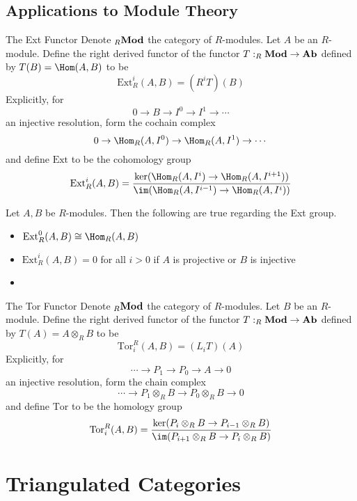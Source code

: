 \documentclass[a4paper]{article}
\begin{document}
\subsection{Applications to Module Theory}
\begin{defn}{The Ext Functor}{} Denote $_R\bold{Mod}$ the category of $R$-modules. Let $A$ be an $R$-module. Define the right derived functor of the functor $T:_R\bold{Mod}\to\bold{Ab}$ defined by $T(B)=\Hom(A,B)$ to be $$\text{Ext}_R^i(A,B)=(R^iT)(B)$$ Explicitly, for $$0\to B\to I^0\to I^1\to\cdots$$ an injective resolution, form the cochain complex $$0\to\Hom_R(A,I^0)\to\Hom_R(A,I^1)\to\cdots$$ and define $\text{Ext}$ to be the cohomology group $$\text{Ext}_R^i(A,B)=\frac{\ker(\Hom_R(A,I^i)\to\Hom_R(A,I^{i+1}))}{\im(\Hom_R(A,I^{i-1})\to\Hom_R(A,I^i))}$$
\end{defn}

\begin{thm}{}{} Let $A,B$ be $R$-modules. Then the following are true regarding the Ext group. 
\begin{itemize}
\item $\text{Ext}_R^0(A,B)\cong\Hom_R(A,B)$
\item $\text{Ext}_R^i(A,B)=0$ for all $i>0$ if $A$ is projective or $B$ is injective
\item
\end{itemize}
\end{thm}

\begin{defn}{The Tor Functor}{} Denote $_R\bold{Mod}$ the category of $R$-modules. Let $B$ be an $R$-module. Define the right derived functor of the functor $T: _R\bold{Mod}\to\bold{Ab}$ defined by $T(A)=A\otimes_RB$ to be $$\text{Tor}_i^R(A,B)=(L_iT)(A)$$ Explicitly, for $$\cdots\to P_1\to P_0\to A\to 0$$ an injective resolution, form the chain complex $$\cdots\to P_1\otimes_RB\to P_0\otimes_RB\to 0$$ and define $\text{Tor}$ to be the homology group $$\text{Tor}_i^R(A,B)=\frac{\ker(P_i\otimes_RB\to P_{i-1}\otimes_RB)}{\im(P_{i+1}\otimes_RB\to P_i\otimes_RB)}$$
\end{defn}

\pagebreak
\section{Triangulated Categories}
\end{document}
